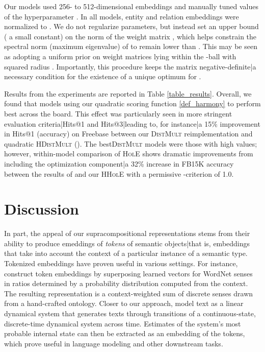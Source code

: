 \documentclass[a4paper,10pt]{article}
\begin{document}
Our models used 256- to 512-dimensional embeddings and manually tuned values of the hyperparameter . In all models, entity and relation embeddings were normalized to . We do not regularize parameters, but instead set an upper bound  ( a small constant) on the  norm of the weight matrix , which helps constrain the spectral norm (maximum eigenvalue) of  to remain lower than . This may be seen as adopting a uniform prior on weight matrices lying within the -ball with squared radius . Importantly, this procedure keeps the matrix  negative-definite|a necessary condition for the existence of a unique optimum for . 

Results from the experiments are reported in Table \ref{table_results}. 
Overall, we found that models using our quadratic scoring function \ref{def_harmony} to perform best across the board. This effect was particularly seen in more stringent evaluation criteria|Hits@1 and Hits@3|leading to, for instance|a 15\% improvement in Hits@1 (accuracy) on Freebase between our \textsc{DistMult} reimplementation and quadratic \textsc{HDistMult} (). The best\textsc{DistMult} models were those with high  values; however, within-model comparison of \textsc{HolE} shows dramatic improvements from including the optimization component|a 32\% increase in FB15K accuracy between the results of \citep{nickel2016hole} and our \textsc{HHolE} with a permissive -criterion of 1.0. 

\section{Discussion} \label{sec_discussion}

In part, the appeal of our supracompositional representations stems from their ability to produce emeddings of \emph{tokens} of semantic objects|that is, embeddings that take into account the context of a particular instance of a semantic type. Tokenized embeddings have proven useful in various settings. For instance, \citet{dasigi2017tokenembeddings} construct token embeddings by superposing learned vectors for WordNet senses in ratios determined by a probability distribution computed from the context. The resulting representation is a context-weighted sum of discrete senses drawn from a hand-crafted ontology. Closer to our approach, \citet{belanger2015lds} model text as a linear dynamical system that generates texts through transitions of a continuous-state, discrete-time dynamical system across time. Estimates of the system's most probable internal state can then be extracted as an embedding of the tokens, which prove useful in language modeling and other downstream tasks.
\end{document}

